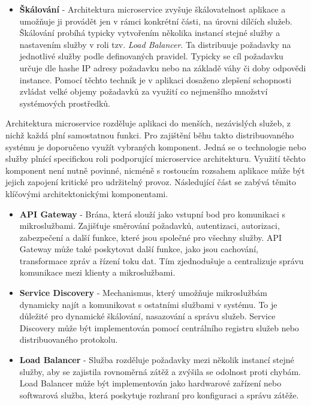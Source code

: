 \begin{itemize}
    \item \textbf{Škálování} - Architektura microservice zvyšuje škálovatelnost aplikace a umožňuje ji provádět jen v rámci konkrétní části, na úrovni dílčích služeb. Škálování probíhá typicky vytvořením několika instancí stejné služby a nastavením služby v roli tzv. \emph{Load Balancer}. Ta distribuuje požadavky na jednotlivé služby podle definovaných pravidel. Typicky se cíl požadavku určuje dle hashe IP adresy požadavku nebo na základě váhy či doby odpovědi instance. \cite{Gammelgaard2021} Pomocí těchto technik je v aplikaci dosaženo zlepšení schopnosti zvládat velké objemy požadavků za využití co nejmenšího množství systémových prostředků. 
\end{itemize}


Architektura microservice rozděluje aplikaci do menších, nezávislých služeb, z nichž každá plní samostatnou funkci. Pro zajištění běhu takto distribuovaného systému je doporučeno využít vybraných komponent. Jedná se o technologie nebo služby plnící specifickou roli podporující microservice architekturu. \cite{Williams2023} Využití těchto komponent není nutně povinné, nicméně s rostoucím rozsahem aplikace může být jejich zapojení kritické pro udržitelný provoz. Následující část se zabývá těmito klíčovými architektonickými komponentami.


\begin{itemize}
    \item \textbf{API Gateway} - Brána, která slouží jako vstupní bod pro komunikaci s mikroslužbami. Zajišťuje směrování požadavků, autentizaci, autorizaci, zabezpečení a další funkce, které jsou společné pro všechny služby. API Gateway může také poskytovat další funkce, jako jsou cachování, transformace zpráv a řízení toku dat. Tím zjednodušuje a centralizuje správu komunikace mezi klienty a mikroslužbami.
    \item \textbf{Service Discovery} - Mechanismus, který umožňuje mikroslužbám dynamicky najít a komunikovat s ostatními službami v systému. To je důležité pro dynamické škálování, nasazování a správu služeb. Service Discovery může být implementován pomocí centrálního registru služeb nebo distribuovaného protokolu. \cite{Richardson2018}
    \item \textbf{Load Balancer} - Služba rozděluje požadavky mezi několik instancí stejné služby, aby se zajistila rovnoměrná zátěž a zvýšila se odolnost proti chybám. Load Balancer může být implementován jako hardwarové zařízení nebo softwarová služba, která poskytuje rozhraní pro konfiguraci a správu zátěže.
\end{itemize}

